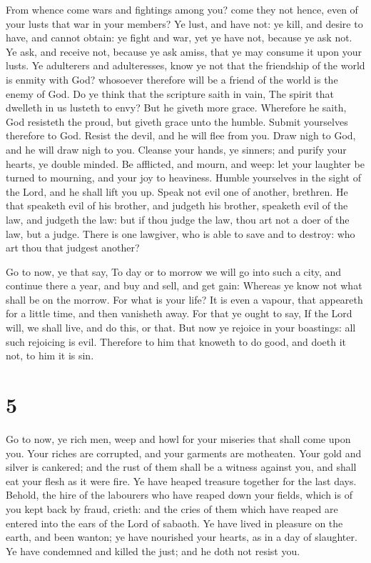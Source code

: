 From whence come wars and fightings among you? come they
not hence, even of your lusts that war in your members?  Ye
lust, and have not: ye kill, and desire to have, and cannot obtain: ye
fight and war, yet ye have not, because ye ask not.  Ye ask,
and receive not, because ye ask amiss, that ye may consume it upon your
lusts.  Ye adulterers and adulteresses, know ye not that the
friendship of the world is enmity with God? whosoever therefore will be
a friend of the world is the enemy of God.  Do ye think that
the scripture saith in vain, The spirit that dwelleth in us lusteth to
envy?  But he giveth more grace. Wherefore he saith, God
resisteth the proud, but giveth grace unto the humble. 
Submit yourselves therefore to God. Resist the devil, and he will flee
from you.  Draw nigh to God, and he will draw nigh to you.
Cleanse your hands, ye sinners; and purify your hearts, ye double
minded.  Be afflicted, and mourn, and weep: let your
laughter be turned to mourning, and your joy to heaviness. 
Humble yourselves in the sight of the Lord, and he shall lift you up.
 Speak not evil one of another, brethren. He that speaketh
evil of his brother, and judgeth his brother, speaketh evil of the law,
and judgeth the law: but if thou judge the law, thou art not a doer of
the law, but a judge.  There is one lawgiver, who is able
to save and to destroy: who art thou that judgest another?

 Go to now, ye that say, To day or to morrow we will go
into such a city, and continue there a year, and buy and sell, and get
gain:  Whereas ye know not what shall be on the morrow. For
what is your life? It is even a vapour, that appeareth for a little
time, and then vanisheth away.  For that ye ought to say,
If the Lord will, we shall live, and do this, or that.  But
now ye rejoice in your boastings: all such rejoicing is evil.
 Therefore to him that knoweth to do good, and doeth it
not, to him it is sin.

\hypertarget{section-4}{%
\section{5}\label{section-4}}

 Go to now, ye rich men, weep and howl for your miseries
that shall come upon you.  Your riches are corrupted, and
your garments are motheaten.  Your gold and silver is
cankered; and the rust of them shall be a witness against you, and shall
eat your flesh as it were fire. Ye have heaped treasure together for the
last days.  Behold, the hire of the labourers who have
reaped down your fields, which is of you kept back by fraud, crieth: and
the cries of them which have reaped are entered into the ears of the
Lord of sabaoth.  Ye have lived in pleasure on the earth,
and been wanton; ye have nourished your hearts, as in a day of
slaughter.  Ye have condemned and killed the just; and he
doth not resist you.

